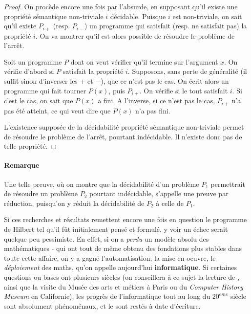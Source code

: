 \begin{proof}
On procède encore une fois par l'absurde, en supposant qu'il existe une propriété sémantique non-triviale $i$ décidable. Puisque $i$ est non-triviale, on sait qu'il existe $P_{i+}$ (resp. $P_{i-}$) un programme qui satisfait (resp. ne satisfait pas) la propriété $i$. On va montrer qu'il est alors possible de résoudre le problème de l'arrêt.

Soit un programme $P$ dont on veut vérifier qu'il termine sur l'argument $x$. On vérifie d'abord si $P$ satisfait la propriété $i$. Supposons, sans perte de généralité (il suffit sinon d'inverser les $+$ et $-$), que ce n'est pas le cas. On écrit alors un programme qui fait tourner $P(x)$, puis $P_{i+}$. On vérifie si le tout satisfait $i$. Si c'est le cas, on sait que $P(x)$ a fini. A l'inverse, si ce n'est pas le cas, $P_{i+}$ n'a pas été atteint, ce qui veut dire que $P(x)$ n'a pas fini.

L'existence supposée de la décidabilité propriété sémantique non-triviale permet de 
résoudre le problème de l'arrêt, pourtant indécidable. Il n'existe donc pas de telle propriété.\end{proof}

\paragraph{Remarque} Une telle preuve, où on montre que la décidabilité d'un problème $P_1$ permettrait de résoudre un problème $P_2$ pourtant indécidable, s'appelle une preuve par réduction, puisqu'on y réduit la décidabilité de $P_2$ à celle de $P_1$.

Si ces recherches et résultats remettent encore une fois en question le programme de Hilbert tel qu'il fût initialement pensé et formulé, y voir un échec serait quelque peu pessimiste. En effet, si on a \textit{perdu} un modèle absolu des mathématiques - qui ont tout de même obtenu des fondations plus stables dans toute cette affaire, on y a gagné l'automatisation, la mise en oeuvre, le \textit{déploiement} des maths, qu'on appelle aujourd'hui \textbf{informatique}. Si certaines questions ou bases ont plusieurs siècles (on conseillera à ce sujet la lecture de \cite{montaigne}, ainsi que la visite du Musée des arts et métiers à Paris ou du \textit{Computer History Museum} en Californie), les progrès de l'informatique tout au long du $20^{eme}$ siècle sont absolument phénoménaux, et le sont restés à date d'écriture. 



